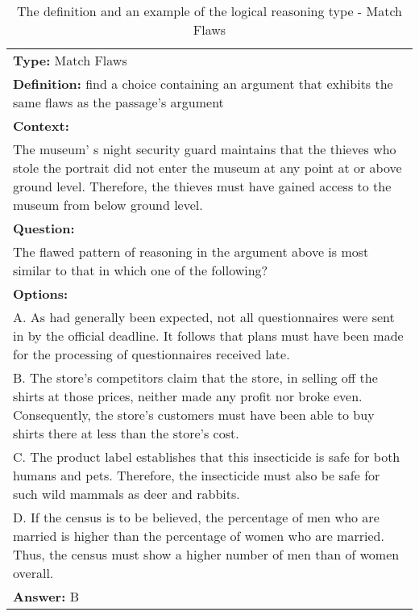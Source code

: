 \documentclass{article} \usepackage{iclr2020_conference,times}
\begin{document}
\begin{table}
	\small
	\centering
	\caption{The definition and an example of the logical reasoning type - Match Flaws}
	\begin{tabular}{|p{}|}
		\hline
		{\bf Type: }Match Flaws\\
		
		{\bf Definition: }find a choice containing an argument that exhibits the same flaws as the passage's argument
		\\
		\hline
		{\bf Context:} \\The museum' s night security guard maintains that the thieves who stole the portrait did not enter the museum at any point at or above ground level. Therefore, the thieves must have gained access to the museum from below ground level.
		\\
		{\bf Question:}\\The flawed pattern of reasoning in the argument above is most similar to that in which one of the following?\\
		{\bf Options:}\\
			A. As had generally been expected, not all questionnaires were sent in by the official deadline. It follows that plans must have been made for the processing of questionnaires received late.\\
			B. The store's competitors claim that the store, in selling off the shirts at those prices, neither made any profit nor broke even. Consequently, the store's customers must have been able to buy shirts there at less than the store's cost.\\
			C. The product label establishes that this insecticide is safe for both humans and pets. Therefore, the insecticide must also be safe for such wild mammals as deer and rabbits.\\
			D. If the census is to be believed, the percentage of men who are married is higher than the percentage of women who are married. Thus, the census must show a higher number of men than of women overall.\\
		{\bf Answer: } B\\
		\hline
	\end{tabular}
	\label{tab:match-flaws}
\end{table}
\end{document}
